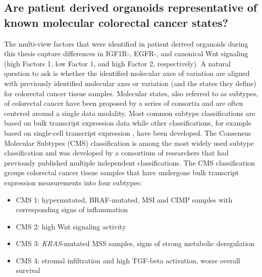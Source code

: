 \begin{flushleft}
\subsection{Are patient derived organoids representative of known molecular colorectal cancer states?}

The multi-view factors that were identified in patient derived organoids during this thesis capture differences in IGF1R-, EGFR-, and canonical Wnt signaling (high Factors 1, low Factor 1, and high Factor 2, respectively). A natural question to ask is whether the identified molecular axes of variation are aligned with previously identified molecular axes or variation (and the states they define) for colorectal cancer tissue samples. Molecular states, also referred to as subtypes, of colorectal cancer have been proposed by a series of consortia and are often centered around a single data modality. Most common subtype classifications are based on bulk transcript expression data \citep{guinneyConsensusMolecularSubtypes2015} while other classifications, for example based on single-cell transcript expression \citep{joanitoSinglecellBulkTranscriptome2022}, have been developed. The Consensus Molecular Subtypes (CMS) classification \citep{guinneyConsensusMolecularSubtypes2015} is among the most widely used subtype classification and was developed by a consortium of researchers that had previously published multiple independent classifications. The CMS classification groups colorectal cancer tissue samples that have undergone bulk transcript expression measurements into four subtypes:

\begin{itemize} 
    \item CMS 1: hypermutated, BRAF-mutated, MSI and CIMP samples with corresponding signs of inflammation
    \item CMS 2: high Wnt signaling activity
    \item CMS 3: \textit{KRAS}-mutated MSS samples, signs of strong metabolic deregulation
    \item CMS 4: stromal infiltration and high TGF-beta activation, worse overall survival
\end{itemize}


\end{flushleft}
